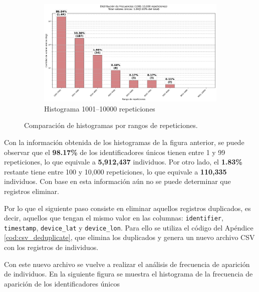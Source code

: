 \begin{figure}[htbp]
    \begin{subfigure}[t]{0.48\textwidth}
        \centering
        \includegraphics[width=\linewidth]{img/histograma_1k-10k_identifier_Mobility_Data_Slim.png}
        \caption{Histograma 1001–10000 repeticiones}
        \label{fig:sub3}
    \end{subfigure}

    \caption{Comparación de histogramas por rangos de repeticiones.}
    \label{fig:histogramas}
\end{figure}

Con la información obtenida de los histogramas de la figura anterior, se puede observar que el \textbf{98.17\%} de los identificadores únicos tienen entre 1 y 99 repeticiones, lo que equivale a \textbf{5,912,437} individuos. Por otro lado, el \textbf{1.83\%} restante tiene entre 100 y 10,000 repeticiones, lo que equivale a \textbf{110,335} individuos. Con base en esta información aún no se puede determinar que registros eliminar.

Por lo que el siguiente paso consiste en eliminar aquellos registros duplicados, es decir, aquellos que tengan el mismo valor en las columnas: 
\texttt{identifier}, \texttt{timestamp}, \texttt{device\_lat} y \texttt{device\_lon}. Para ello se utiliza el código del Apéndice \ref{cod:csv_deduplicate}, que elimina los duplicados y genera un nuevo archivo CSV con los registros de individuos.

Con este nuevo archivo se vuelve a realizar el análisis de frecuencia de aparición de individuos. En la siguiente figura se muestra el histograma de la frecuencia de aparición de los identificadores únicos

